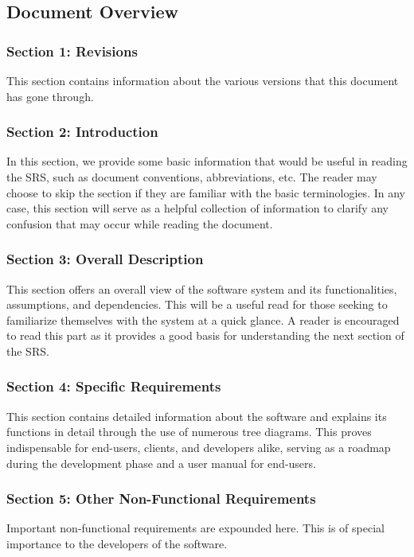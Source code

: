 \documentclass[11pt]{article}
\begin{document}
\subsection*{Document Overview}
\subsubsection*{Section 1: Revisions}
This section contains information about the various versions that this document has gone through.

\subsubsection*{Section 2: Introduction}
In this section, we provide some basic information that would be useful in reading the SRS, such as document conventions, abbreviations, etc. The reader may choose to skip the section if they are familiar with the basic terminologies. In any case, this section will serve as a helpful collection of information to clarify any confusion that may occur while reading the document.

\subsubsection*{Section 3: Overall Description}
This section offers an overall view of the software system and its functionalities, assumptions, and dependencies. This will be a useful read for those seeking to familiarize themselves with the system at a quick glance. A reader is encouraged to read this part as it provides a good basis for understanding the next section of the SRS.

\subsubsection*{Section 4: Specific Requirements}
This section contains detailed information about the software and explains its functions in detail through the use of numerous tree diagrams. This proves indispensable for end-users, clients, and developers alike, serving as a roadmap during the development phase and a user manual for end-users.

\subsubsection*{Section 5: Other Non-Functional Requirements}
Important non-functional requirements are expounded here. This is of special importance to the developers of the software.
\end{document}
